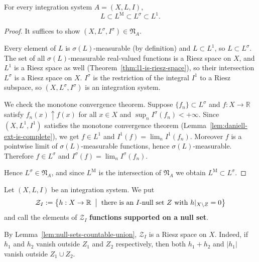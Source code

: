 \begin{proposition}\label{prop:LM-in-Lsigma}
  For every integration system $A=(X,L,I)$,
  \[
    L\subset L^{\mathrm{M}}\subset L^{\sigma}\subset L^1 .
  \]
\end{proposition}
\begin{proof}
  It suffices to show $(X,L^{\sigma},I^{\sigma})\in\mathfrak{N}_A$.

  Every element of $L$ is $\sigma(L)$-measurable (by definition) and
  $L\subset L^1$, so $L\subset L^{\sigma}$.
  The set of all $\sigma(L)$-measurable real-valued functions is a Riesz space on
  $X$, and $L^1$ is a Riesz space as well
  (Theorem~\ref{thm:l1-is-riesz-space}), so their intersection $L^{\sigma}$ is a
  Riesz space on $X$.
  $I^{\sigma}$ is the restriction of the integral $I^1$ to a Riesz subspace, so
  $(X,L^{\sigma},I^{\sigma})$ is an integration system.

  We check the monotone convergence theorem. Suppose
  $\{f_n\}\subset L^{\sigma}$ and $f:X\to\mathbb{R}$ satisfy
  $f_n(x)\uparrow f(x)$ for all $x\in X$ and
  $\sup_nI^{\sigma}(f_n)<+\infty$.
  Since $(X,L^1,I^1)$ satisfies the monotone convergence theorem
  (Lemma~\ref{lem:daniell-ext-is-complete}), we get $f\in L^1$ and
  $I^1(f)=\lim_nI^1(f_n)$.
  Moreover $f$ is a pointwise limit of $\sigma(L)$-measurable functions, hence
  $\sigma(L)$-measurable.
  Therefore $f\in L^{\sigma}$ and $I^{\sigma}(f)=\lim_nI^{\sigma}(f_n)$.

  Hence $L^{\sigma}\in\mathfrak{N}_A$, and since $L^{\mathrm{M}}$ is the
  intersection of $\mathfrak{N}_A$ we obtain
  $L^{\mathrm{M}}\subset L^{\sigma}$.
\end{proof}

\begin{definition}\label{def:supported-on-null}
  Let $(X,L,I)$ be an integration system. We put
  \[
    \mathcal{Z}_I:=\bigl\{h:X\to\mathbb{R}\;\bigm|\;
      \text{there is an $I$-null set $Z$ with $h|_{X\setminus Z}=0$}\bigr\}
  \]
  and call the elements of $\mathcal{Z}_I$ \textbf{functions supported on a null
  set}.
\end{definition}

\noindent
By Lemma~\ref{lem:null-sets-countable-union}, $\mathcal{Z}_I$ is a Riesz space on
$X$.
Indeed, if $h_1$ and $h_2$ vanish outside $Z_1$ and $Z_2$ respectively, then
both $h_1+h_2$ and $|h_1|$ vanish outside $Z_1\cup Z_2$.

